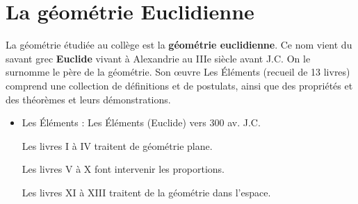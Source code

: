 \documentclass[a4paper,dvipsnames]{article}
\begin{document}
\section{La géométrie Euclidienne}

\begin{His}
La géométrie étudiée au collège est la \textbf{géométrie euclidienne}. Ce nom vient du savant grec \textbf{Euclide} vivant à Alexandrie au IIIe siècle avant J.C. On le surnomme le père de la géométrie. Son œuvre \textcolor{sacado_orange}{Les Éléments} (recueil de 13 livres) comprend une collection de \textcolor{sacado_orange}{définitions} et de \textcolor{sacado_orange}{postulats}, ainsi que des \textcolor{sacado_orange}{propriétés} et des \textcolor{sacado_orange}{théorèmes} et leurs démonstrations.

\begin{Def}
\begin{itemize}
\item \textcolor{sacado_orange}{Les Éléments} : Les Éléments (Euclide) vers 300 av. J.C.

Les livres I à IV traitent de géométrie plane.

Les livres V à X font intervenir les proportions.

Les livres XI à XIII traitent de la géométrie dans l'espace.



\end{itemize}
\end{Def}
\end{His}
\end{document}
